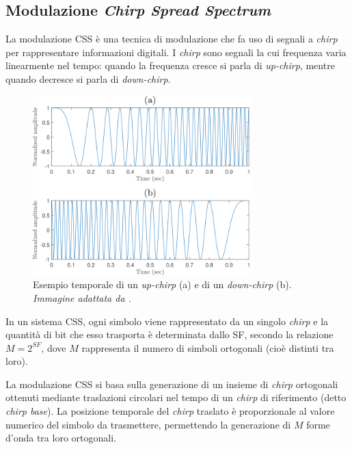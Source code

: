 \documentclass[12pt,a4paper,twoside]{book}
\begin{document}
\subsection{Modulazione \emph{Chirp Spread Spectrum}}
La modulazione \ac{CSS} è una tecnica di modulazione che fa uso di segnali a
\emph{chirp} per rappresentare informazioni digitali. I \emph{chirp} sono segnali
la cui frequenza varia linearmente nel tempo: quando la frequenza cresce si parla
di \emph{up-chirp}, mentre quando decresce si parla di \emph{down-chirp}.

\begin{figure}[H]
    \centering
    \includegraphics[width=0.75\textwidth]{img/up-chirp-down-chirp.png}
    \caption[Up-chirp e down-chirp]{%
        Esempio temporale di un \emph{up-chirp} (a) e di un \emph{down-chirp} (b).
        \textit{\tiny{Immagine adattata da \cite{10609524}.}}%
    }
    \label{fig:up-chirp-down-chirp}
\end{figure}

In un sistema CSS, ogni simbolo viene rappresentato da un singolo \emph{chirp} e
la quantità di bit che esso trasporta è determinata dallo \ac{SF}, secondo la relazione
$M = 2^{SF}$, dove $M$ rappresenta il numero di simboli ortogonali (cioè distinti
tra loro).

La modulazione \ac{CSS} si basa sulla generazione di un insieme di \emph{chirp}
ortogonali ottenuti mediante traslazioni circolari nel tempo di un \emph{chirp}
di riferimento (detto \emph{chirp base}). La posizione temporale del \emph{chirp}
traslato è proporzionale al valore numerico del simbolo da trasmettere, permettendo
la generazione di $M$ forme d'onda tra loro ortogonali.
\end{document}
